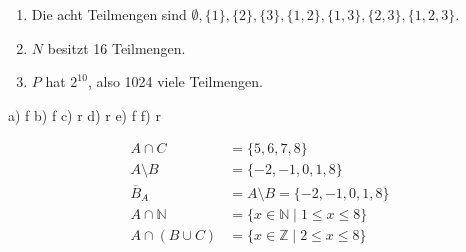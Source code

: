 \begin{enumerate}[label=\alph*)]
  \item Die acht Teilmengen sind $\emptyset, \{1\}, \{2\}, \{3\}, \{1,2\}, \{1,3\}, \{2,3\}, \{1,2,3\}$.
  \item $N$ besitzt 16 Teilmengen.
  \item $P$ hat $2^{10}$, also 1024 viele Teilmengen.
\end{enumerate}

a) f \qquad b) f \qquad c) r \qquad d) r \qquad e) f \qquad f) r

\begin{align*}
  A \cap C &= \{5,6,7,8\}\\
  A \setminus B &= \{-2,-1,0,1,8\}\\
  \overline{B}_A &= A \setminus B = \{-2,-1,0,1,8\}\\
  A \cap \mathbb{N} &= \{x \in \mathbb{N} \mid 1 \leq x \leq 8\}\\
  A \cap (B \cup C) &= \{x \in \mathbb{Z} \mid 2 \leq x \leq 8\}
\end{align*}
